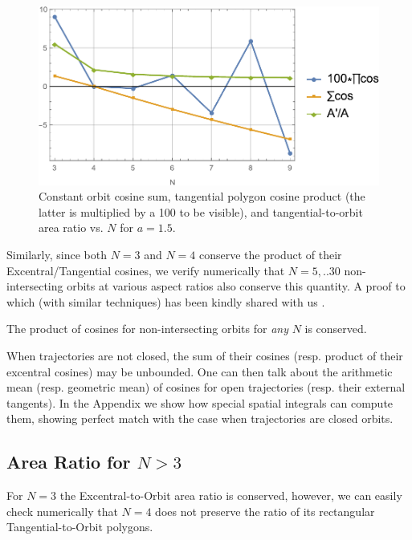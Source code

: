 \begin{figure}[H]
    \centering
    \includegraphics[width=\textwidth]{pics/0160_gener_prod_sum_area.pdf}
    \caption{Constant orbit cosine sum, tangential polygon cosine product (the latter is multiplied by a 100 to be visible), and tangential-to-orbit area ratio vs. $N$ for $a=1.5$.}
    \label{fig:gen-prod-sum}
\end{figure}

Similarly, since both $N=3$ and $N=4$ conserve the product of their Excentral/Tangential cosines, we verify numerically that $N=5,..30$ non-intersecting orbits at various aspect ratios also conserve this quantity. A proof to which (with similar techniques) has been kindly shared with us \cite{sergei19_private_meromorphic}.

\begin{theorem}
The product of cosines for non-intersecting orbits for {\em any} $N$ is conserved.
\end{theorem}

When trajectories are not closed, the sum of their cosines (resp. product of their excentral cosines) may be unbounded. One can then talk about the arithmetic mean (resp. geometric mean) of cosines for open trajectories (resp. their external tangents). In the Appendix we show how special spatial integrals can compute them, showing perfect match with the case when trajectories are closed orbits.

\subsection{Area Ratio for $N>3$}

For $N=3$ the Excentral-to-Orbit area ratio is conserved, however, we can easily check numerically that $N=4$ does not preserve the ratio of its rectangular Tangential-to-Orbit polygons.

